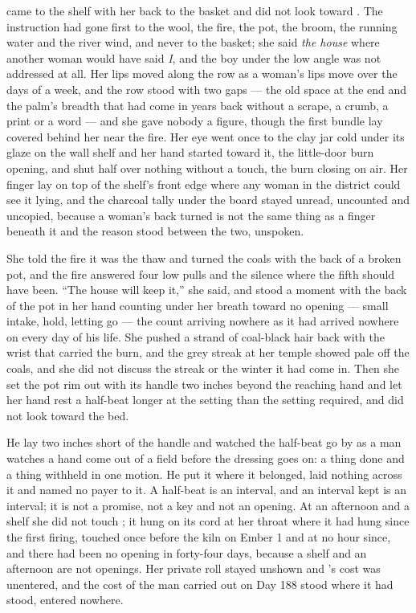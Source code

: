 came to the shelf with her back to the basket and did not look toward . The instruction had gone first to the wool, the fire, the pot, the broom, the running water and the river wind, and never to the basket; she said \emph{the house} where another woman would have said \emph{I}, and the boy under the low angle was not addressed at all. Her lips moved along the row as a woman's lips move over the days of a week, and the row stood with two gaps --- the old space at the end and the palm's breadth that had come in years back without a scrape, a crumb, a print or a word --- and she gave nobody a figure, though the first bundle lay covered behind her near the fire. Her eye went once to the clay jar cold under its glaze on the wall shelf and her hand started toward it, the little-door burn opening, and shut half over nothing without a touch, the burn closing on air. Her finger lay on top of the shelf's front edge where any woman in the district could see it lying, and the charcoal tally under the board stayed unread, uncounted and uncopied, because a woman's back turned is not the same thing as a finger beneath it and the reason stood between the two, unspoken.

She told the fire it was the thaw and turned the coals with the back of a broken pot, and the fire answered four low pulls and the silence where the fifth should have been. “The house will keep it,” she said, and stood a moment with the back of the pot in her hand counting under her breath toward no opening --- small intake, hold, letting go --- the count arriving nowhere as it had arrived nowhere on every day of his life. She pushed a strand of coal-black hair back with the wrist that carried the burn, and the grey streak at her temple showed pale off the coals, and she did not discuss the streak or the winter it had come in. Then she set the pot rim out with its handle two inches beyond the reaching hand and let her hand rest a half-beat longer at the setting than the setting required, and did not look toward the bed.

He lay two inches short of the handle and watched the half-beat go by as a man watches a hand come out of a field before the dressing goes on: a thing done and a thing withheld in one motion. He put it where it belonged, laid nothing across it and named no payer to it. A half-beat is an interval, and an interval kept is an interval; it is not a promise, not a key and not an opening. At an afternoon and a shelf she did not touch ; it hung on its cord at her throat where it had hung since the first firing, touched once before the kiln on Ember 1 and at no hour since, and there had been no opening in forty-four days, because a shelf and an afternoon are not openings. Her private roll stayed unshown and 's cost was unentered, and the cost of the man carried out on Day 188 stood where it had stood, entered nowhere.

